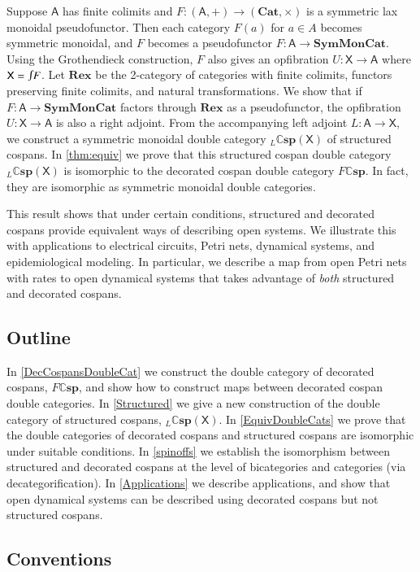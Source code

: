 \documentclass[reqno]{amsart}
\let\maps\colon
\theoremstyle{definition}
\theoremstyle{remark}
\newcommand{\A}{\mathsf{A}}
\newcommand{\X}{\mathsf{X}}
\newcommand{\bicat}{\mathbf}
\newcommand{\Cat}{\bicat{Cat}}
\newcommand{\Rex}{\bicat{Rex}}
\newcommand{\SMC}{\bicat{SymMonCat}}
\newcommand{\double}[1]{\mathbf{\mathbb #1}}
\newcommand{\lCsp}{\double{Csp}}
\newcommand{\inta}{\raisebox{.3\depth}{$\smallint\hspace{-.01in}$}}
\begin{document}
Suppose $\A$ has finite colimits and $F \maps (\A , +) \to (\Cat, \times)$ is a symmetric lax monoidal pseudofunctor.  Then each category $F(a)$ for $a \in A$ becomes symmetric monoidal, and $F$ becomes a pseudofunctor $F \maps \A \to \SMC$.    Using the Grothendieck construction, $F$ also gives an opfibration $U \maps \X \to \A$ where $\X = \inta F$.   Let $\Rex$ be the 2-category of categories with finite colimits, functors preserving finite colimits, and natural transformations.  We show that if $F \maps \A \to \SMC$ factors through $\Rex$ as a pseudofunctor, the opfibration $U \maps \X \to \A$ is also a right adjoint.   From the accompanying left adjoint $L \maps \A \to \X$, we  construct a symmetric monoidal double category ${}_L \lCsp(\X)$ of structured cospans.  In \cref{thm:equiv} we prove that this structured cospan double category ${}_L \lCsp(\X)$ is isomorphic to the decorated cospan double category $F \lCsp$.   In fact, they are isomorphic as symmetric monoidal double categories.

This result shows that under certain conditions, structured and decorated cospans provide equivalent ways of describing open systems.  We illustrate this with applications to electrical circuits, Petri nets, dynamical systems, and epidemiological modeling.  In particular, we describe a map from open Petri nets with rates to open dynamical systems that takes advantage of \emph{both} structured and decorated cospans.

\subsection*{Outline}

In \cref{DecCospansDoubleCat} we construct the double category of decorated cospans, $F\lCsp$, and show how to construct maps between decorated cospan double categories. In \cref{Structured} we give a new construction of the double category of structured cospans, ${}_L \lCsp(\X)$.  In \cref{EquivDoubleCats} we prove that the double categories of decorated cospans and structured cospans are isomorphic under suitable conditions.  In \cref{spinoffs} we establish the isomorphism between structured and decorated cospans at the level of bicategories and categories (via decategorification).  In \cref{Applications} we describe applications, and show that open dynamical systems can be described using decorated cospans but not structured cospans.

\subsection*{Conventions}
\end{document}
